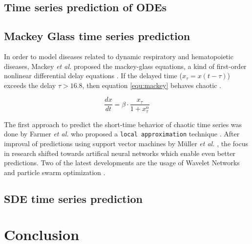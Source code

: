 \documentclass{article}
\begin{document}
\subsection{Time series prediction of ODEs}

\subsection{Mackey Glass time series prediction}

In order to model diseases related to dynamic respiratory and hematopoietic
diseases, Mackey \textit{et al.} proposed the mackey-glass equations, a kind of
first-order nonlinear differential delay equations \cite{mackey1977}. If the
delayed time ($x_{\tau} = x(t - \tau)$) exceeds the delay $\tau > 16.8$, then
equation \ref{equ:mackey} behaves chaotic \cite{farmer1982}.

\begin{equation}
  \frac{dx}{dt} = \beta \cdot \frac{x_{\tau}}{1 + x_{\tau}^n}
  \label{equ:mackey}
\end{equation}

The first approach to predict the short-time behavior of chaotic time series
was done by Farmer \textit{et al.} who proposed a \texttt{local approximation}
technique \cite{farmer1987}. After improval of predictions using support vector
machines by Müller \textit{et al.} \cite{muller1997}, the focus in research
shifted towards artifical neural networks which enable even better predictions.
Two of the latest developments are the usage of Wavelet Networks
\cite{alexandridis2013} and particle swarm optimization \cite{caraballo2016}.


\subsection{SDE time series prediction}

\section{Conclusion}



\end{document}
